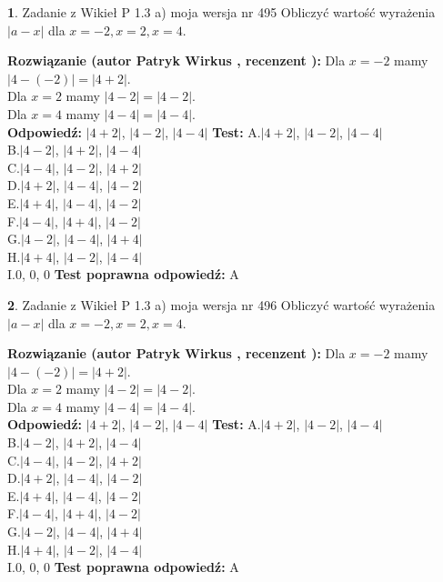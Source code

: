 \documentclass[12pt, a4paper]{article}
\theoremstyle{definition} %
\newtheorem{zad}{}
\newcommand{\zadStart}[1]{\begin{zad}#1\newline}
\newcommand{\zadStop}{\end{zad}}
\newcommand{\rozwStart}[2]{\noindent \textbf{Rozwiązanie (autor #1 , recenzent #2): }\newline}
\newcommand{\rozwStop}{\newline}
\newcommand{\odpStart}{\noindent \textbf{Odpowiedź:}\newline}
\newcommand{\odpStop}{\newline}
\newcommand{\testStart}{\noindent \textbf{Test:}\newline}
\newcommand{\testStop}{\newline}
\newcommand{\kluczStart}{\noindent \textbf{Test poprawna odpowiedź:}\newline}
\newcommand{\kluczStop}{\newline}
\begin{document}
\zadStart{Zadanie z Wikieł P 1.3 a) moja wersja nr 495}
Obliczyć wartość wyrażenia $|a - x|$ dla $x=-2,x=2,x=4$.
\zadStop
\rozwStart{Patryk Wirkus}{}
Dla $x = -2$ mamy $|4 - (-2)| = |4 + 2|$.\\
Dla $x = 2$ mamy $|4 - 2| = |4 - 2|$.\\
Dla $x = 4$ mamy $|4 - 4| = |4 - 4|$.\\
\rozwStop
\odpStart
$|4 + 2|$, $|4 - 2|$, $|4 - 4|$
\odpStop
\testStart
A.$|4 + 2|$, $|4 - 2|$, $|4 - 4|$\\
B.$|4 - 2|$, $|4 + 2|$, $|4 - 4|$\\
C.$|4 - 4|$, $|4 - 2|$, $|4 + 2|$\\
D.$|4 + 2|$, $|4 - 4|$, $|4 - 2|$\\
E.$|4 + 4|$, $|4 - 4|$, $|4 - 2|$\\
F.$|4 - 4|$, $|4 + 4|$, $|4 - 2|$\\
G.$|4 - 2|$, $|4 - 4|$, $|4 + 4|$\\
H.$|4 + 4|$, $|4 - 2|$, $|4 - 4|$\\
I.$0$, $0$, $0$
\testStop
\kluczStart
A
\kluczStop



\zadStart{Zadanie z Wikieł P 1.3 a) moja wersja nr 496}
Obliczyć wartość wyrażenia $|a - x|$ dla $x=-2,x=2,x=4$.
\zadStop
\rozwStart{Patryk Wirkus}{}
Dla $x = -2$ mamy $|4 - (-2)| = |4 + 2|$.\\
Dla $x = 2$ mamy $|4 - 2| = |4 - 2|$.\\
Dla $x = 4$ mamy $|4 - 4| = |4 - 4|$.\\
\rozwStop
\odpStart
$|4 + 2|$, $|4 - 2|$, $|4 - 4|$
\odpStop
\testStart
A.$|4 + 2|$, $|4 - 2|$, $|4 - 4|$\\
B.$|4 - 2|$, $|4 + 2|$, $|4 - 4|$\\
C.$|4 - 4|$, $|4 - 2|$, $|4 + 2|$\\
D.$|4 + 2|$, $|4 - 4|$, $|4 - 2|$\\
E.$|4 + 4|$, $|4 - 4|$, $|4 - 2|$\\
F.$|4 - 4|$, $|4 + 4|$, $|4 - 2|$\\
G.$|4 - 2|$, $|4 - 4|$, $|4 + 4|$\\
H.$|4 + 4|$, $|4 - 2|$, $|4 - 4|$\\
I.$0$, $0$, $0$
\testStop
\kluczStart
A
\kluczStop
\end{document}
